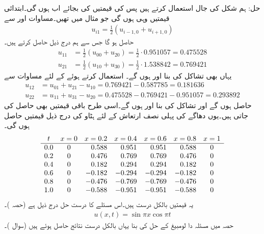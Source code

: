 حل:\quad
ہم شکل  کی جال استعمال کرتے ہیں پس  کی قیمتیں  کی بجائے اب  ہوں گی۔ابتدائی قیمتیں  وہی ہوں گی جو مثال  میں تھیں۔مساوات  اور  سے
\begin{align*}
u_{i1}=\frac{1}{2}(u_{i-1,0}+u_{i+1,0})
\end{align*}
حاصل ہو گا جس سے ہم درج ذیل حاصل کرتے ہیں۔
\begin{align*}
u_{11}&=\frac{1}{2}(u_{00}+u_{20})=\tfrac{1}{2}\cdot \num{0.951057}=\num{0.475528}\\
u_{21}&=\frac{1}{2}(u_{10}+u_{30})=\tfrac{1}{2}\cdot \num{1.538842}=\num{0.769421}
\end{align*}
یہاں بھی تشاکل کی بنا  اور  ہوں گے۔ استعمال کرتے ہوئے  کے لئے مساوات  سے
\begin{align*}
u_{12}&=u_{01}+u_{21}-u_{10}=\num{0.769421}-\num{0.587785}=\num{0.181636}\\
u_{22}&=u_{11}+u_{31}-u_{20}=\num{0.475528}-\num{0.769421}-\num{0.951057}=\num{0.293892}
\end{align*}
حاصل ہوں گے اور تشاکل کی بنا  اور  ہوں گے۔اسی طرح باقی قیمتیں بھی حاصل کی جاتی ہیں۔یوں دھاگے کی پہلی نصف ارتعاش کے لئے ہٹاو  کی درج ذیل قیمتیں حاصل ہوں گی۔
\begin{align*}
\centering
\begin{array}{ccrrrrc}
t&x=0&x=0.2&x=0.4&x=0.6&x=0.8&x=1\\
\hline
0.0&0&0.588&0.951&0.951&0.588&0\\
0.2&0&0.476&0.769&0.769&0.476&0\\
0.4&0&0.182&0.294&0.294&0.182&0\\
0.6&0&-0.182&-0.294&-0.294&-0.182&0\\
0.8&0&-0.476&-0.769&-0.769&-0.476&0\\
1.0&0&-0.588&-0.951&-0.951&-0.588&0
\end{array}
\end{align*}
یہ قیمتیں بالکل درست ہیں۔اس مسئلے کا درست حل درج ذیل ہے (حصہ )۔
\begin{align*}
u(x,t)=\sin\pi x \cos \pi t
\end{align*} 
حصہ  میں مسئلہ دا لومبیغ کے حل کی بنا یہاں بالکل درست نتائج حاصل ہوئے ہیں (سوال )۔


